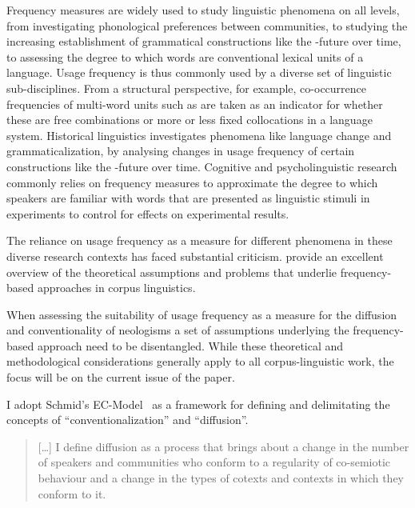 \documentclass[a4paper]{scrartcl}
\begin{document}
    Frequency measures are widely used to study linguistic phenomena on all levels, from investigating phonological preferences between communities, to studying the increasing establishment of grammatical constructions like the -future over time, to assessing the degree to which words are conventional lexical units of a language. Usage frequency is thus commonly used by a diverse set of linguistic sub-disciplines. From a structural perspective, for example, co-occurrence frequencies of multi-word units such as  are taken as an indicator for whether these are free combinations or more or less fixed collocations in a language system. Historical linguistics investigates phenomena like language change and grammaticalization, by analysing changes in usage frequency of certain constructions like the -future over time. Cognitive and psycholinguistic research commonly relies on frequency measures to approximate the degree to which speakers are familiar with words that are presented as linguistic stimuli in experiments to control for effects on experimental results.

    The reliance on usage frequency as a measure for different phenomena in these diverse research contexts has faced substantial criticism. \cite{Stefanowitsch2017} provide an excellent overview of the theoretical assumptions and problems that underlie frequency-based approaches in corpus linguistics.


    When assessing the suitability of usage frequency as a measure for the diffusion and conventionality of neologisms a set of assumptions underlying the frequency-based approach need to be disentangled. While these theoretical and methodological considerations generally apply to all corpus-linguistic work, the focus will be on the current issue of the paper.

    I adopt Schmid's EC-Model~\parencite{Schmid2020} as a framework for defining and delimitating the concepts of \enquote{conventionalization} and \enquote{diffusion}.

    \begin{quote}
      [\dots] I define diffusion as a process that brings about a change in the number of speakers and communities who conform to a regularity of co-semiotic behaviour and a change in the types of cotexts and contexts in which they conform to it.
    \end{quote}
\end{document}

